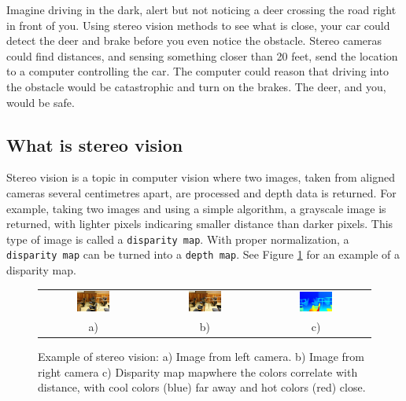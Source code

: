 \documentclass[11pt,fleqn]{article}
\begin{document}
Imagine driving in the dark, alert but not noticing a deer crossing the road right in front of you. Using stereo vision methods to see what is close, your car could detect the deer and brake before you even notice the obstacle. Stereo cameras could find distances, and sensing something closer than 20 feet, send the location to a computer controlling the car. The computer could reason that driving into the obstacle would be catastrophic and turn on the brakes. The deer, and you, would be safe.

\subsection{What is stereo vision}

Stereo vision is a topic in computer vision where two images, taken from aligned cameras several centimetres apart, are processed and depth data is returned. For example, taking two images and using a simple algorithm, a grayscale image is returned, with lighter pixels indicaring smaller distance than darker pixels. This type of image is called a \texttt{disparity map}. With proper normalization, a \texttt{disparity map} can be turned into a \texttt{depth map}. See Figure \ref{fig:example1} for an example of a disparity map.

\begin{figure}[!h]
\begin{mdframed}
\centering
\setlength{}
\begin{tabular}{ccc}
\includegraphics[width=0.32\textwidth]{images/im0-600.jpg} &
\includegraphics[width=0.32\textwidth]{images/im1-600.jpg} &
\includegraphics[width=0.32\textwidth]{images/disp-600.jpg} \\[2pt]
a) & b) & c)
\end{tabular}
\caption[Example of stereo vision]{Example of stereo vision: a) Image from left camera. b) Image from right camera c) Disparity map mapwhere the colors correlate with distance, with cool colors (blue) far away and hot colors (red) close.}
\label{fig:example1}
\end{mdframed}
\end{figure}
\end{document}
